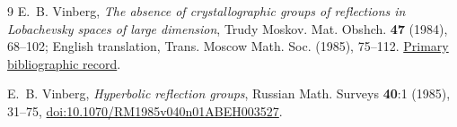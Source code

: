 \documentclass[11pt]{article}
\theoremstyle{remark}
\begin{document}
\begin{thebibliography}{9}
E.~B. Vinberg,
\emph{The absence of crystallographic groups of reflections in
Lobachevsky spaces of large dimension},
Trudy Moskov. Mat. Obshch. \textbf{47} (1984), 68--102;
English translation, Trans. Moscow Math. Soc. (1985), 75--112.
\href{https://www.mathnet.ru/eng/mmo444}{Primary bibliographic record}.

E.~B. Vinberg,
\emph{Hyperbolic reflection groups},
Russian Math. Surveys \textbf{40}:1 (1985), 31--75,
\href{https://doi.org/10.1070/RM1985v040n01ABEH003527}
{doi:10.1070/RM1985v040n01ABEH003527}.
\end{thebibliography}
\end{document}
